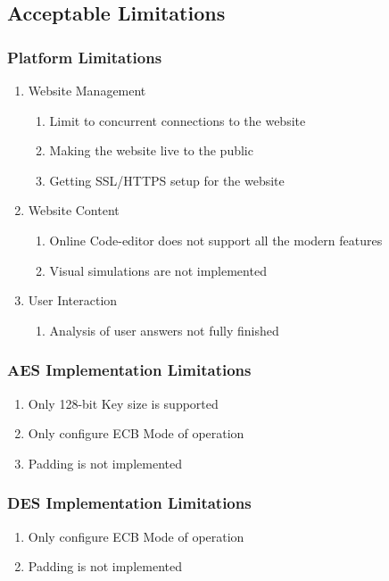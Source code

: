\subsection{Acceptable Limitations}
\subsubsection{Platform Limitations}

\begin{enumerate}
\item{
Website Management
	\begin{enumerate}
		\item{Limit to concurrent connections to the website}
		\item{Making the website live to the public}
		\item{Getting SSL/HTTPS setup for the website}
	\end{enumerate}
}
\item{
Website Content
	\begin{enumerate}
		\item{Online Code-editor does not support all the modern features}
		\item{Visual simulations are not implemented}
	\end{enumerate}
}
\item{
User Interaction
	\begin{enumerate}
		\item{Analysis of user answers not fully finished}
	\end{enumerate}
}
\end{enumerate}

\subsubsection{AES Implementation Limitations}
\begin{enumerate}
\item{Only 128-bit Key size is supported}
\item{Only configure ECB Mode of operation}
\item{Padding is not implemented}
\end{enumerate}
\subsubsection{DES Implementation Limitations}
\begin{enumerate}
\item{Only configure ECB Mode of operation}
\item{Padding is not implemented}
\end{enumerate}
